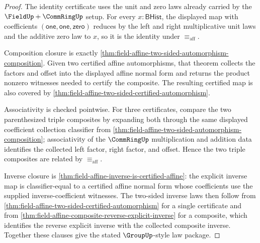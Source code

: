 \begin{proof}
The identity certificate uses the unit and zero laws already carried by the
$\FieldUp+\CommRingUp$ setup. For every $x:\mathsf{BHist}$, the displayed map
with coefficients $(\mathsf{one},\mathsf{one},\mathsf{zero})$ reduces by the
left and right multiplicative unit laws and the additive zero law to $x$, so it
is the identity under $\equiv_{\mathrm{aff}}$.

Composition closure is exactly
\autoref{thm:field-affine-two-sided-automorphism-composition}. Given two
certified affine automorphisms, that theorem collects the factors and offset
into the displayed affine normal form and returns the product nonzero witnesses
needed to certify the composite. The resulting certified map is also covered by
\autoref{thm:field-affine-two-sided-certified-automorphism}.

Associativity is checked pointwise. For three certificates, compare the two
parenthesized triple composites by expanding both through the same displayed
coefficient collection classifier from
\autoref{thm:field-affine-two-sided-automorphism-composition}; associativity of
the $\CommRingUp$ multiplication and addition data identifies the collected
left factor, right factor, and offset. Hence the two triple composites are
related by $\equiv_{\mathrm{aff}}$.

Inverse closure is
\autoref{thm:field-affine-inverse-is-certified-affine}: the explicit inverse
map is classifier-equal to a certified affine normal form whose coefficients
use the supplied inverse-coefficient witnesses. The two-sided inverse laws then
follow from \autoref{thm:field-affine-two-sided-certified-automorphism} for a
single certificate and from
\autoref{thm:field-affine-composite-reverse-explicit-inverse} for a composite,
which identifies the reverse explicit inverse with the collected composite
inverse. Together these clauses give the stated $\GroupUp$-style law package.
\end{proof}

